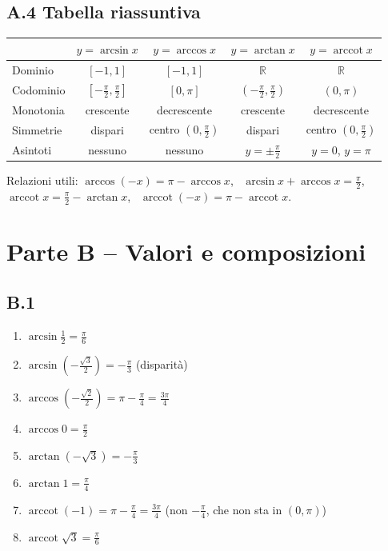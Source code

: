 \documentclass[11pt,a4paper]{article}
\DeclareMathOperator{\arccot}{arccot}
\begin{document}
\subsection*{A.4 Tabella riassuntiva}
\begin{center}
\renewcommand{\arraystretch}{1.6}
\small
\begin{tabular}{|l|c|c|c|c|}
\hline
 & $y=\arcsin x$ & $y=\arccos x$ & $y=\arctan x$ & $y=\arccot x$\\\hline
Dominio & $[-1,1]$ & $[-1,1]$ & $\mathbb{R}$ & $\mathbb{R}$\\\hline
Codominio & $\left[-\frac{\pi}{2},\frac{\pi}{2}\right]$ & $[0,\pi]$ & $\left(-\frac{\pi}{2},\frac{\pi}{2}\right)$ & $(0,\pi)$\\\hline
Monotonia & crescente & decrescente & crescente & decrescente\\\hline
Simmetrie & dispari & centro $\left(0,\frac{\pi}{2}\right)$ & dispari & centro $\left(0,\frac{\pi}{2}\right)$\\\hline
Asintoti & nessuno & nessuno & $y=\pm\frac{\pi}{2}$ & $y=0$, $y=\pi$\\\hline
\end{tabular}
\end{center}
Relazioni utili: $\arccos(-x)=\pi-\arccos x$, \ $\arcsin x+\arccos x=\frac{\pi}{2}$, \ $\arccot x=\frac{\pi}{2}-\arctan x$, \ $\arccot(-x)=\pi-\arccot x$.

\section*{Parte B -- Valori e composizioni}
\subsection*{B.1}
\begin{enumerate}
\item $\arcsin\frac12=\frac{\pi}{6}$
\item $\arcsin\left(-\frac{\sqrt3}{2}\right)=-\frac{\pi}{3}$ \quad (disparit\`a)
\item $\arccos\left(-\frac{\sqrt2}{2}\right)=\pi-\frac{\pi}{4}=\frac{3\pi}{4}$
\item $\arccos 0=\frac{\pi}{2}$
\item $\arctan\left(-\sqrt3\right)=-\frac{\pi}{3}$
\item $\arctan 1=\frac{\pi}{4}$
\item $\arccot(-1)=\pi-\frac{\pi}{4}=\frac{3\pi}{4}$ \quad (non $-\frac{\pi}{4}$, che non sta in $(0,\pi)$)
\item $\arccot\sqrt3=\frac{\pi}{6}$
\end{enumerate}
\end{document}
